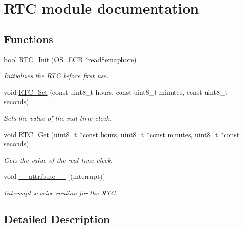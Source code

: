 \hypertarget{group___r_t_c__module}{}\section{R\+T\+C module documentation}
\label{group___r_t_c__module}
\subsection*{Functions}
\begin{DoxyCompactItemize}
\item 
bool \hyperlink{group___r_t_c__module_ga8f6fdd811ffd21bc967984a6046ec8b4}{R\+T\+C\+\_\+\+Init} (O\+S\+\_\+\+E\+C\+B $\ast$read\+Semaphore)
\begin{DoxyCompactList}\small\item\em Initializes the R\+T\+C before first use. \end{DoxyCompactList}\item 
void \hyperlink{group___r_t_c__module_gacbe916e4fad6bfc2ffcde604fa6afb52}{R\+T\+C\+\_\+\+Set} (const uint8\+\_\+t hours, const uint8\+\_\+t minutes, const uint8\+\_\+t seconds)
\begin{DoxyCompactList}\small\item\em Sets the value of the real time clock. \end{DoxyCompactList}\item 
void \hyperlink{group___r_t_c__module_ga46e1f15e3b27e2de58d7f213a3bc865d}{R\+T\+C\+\_\+\+Get} (uint8\+\_\+t $\ast$const hours, uint8\+\_\+t $\ast$const minutes, uint8\+\_\+t $\ast$const seconds)
\begin{DoxyCompactList}\small\item\em Gets the value of the real time clock. \end{DoxyCompactList}\item 
void \hyperlink{group___r_t_c__module_ga445500277ba0e363873b34cffc015745}{\+\_\+\+\_\+attribute\+\_\+\+\_\+} ((interrupt))
\begin{DoxyCompactList}\small\item\em Interrupt service routine for the R\+T\+C. \end{DoxyCompactList}\end{DoxyCompactItemize}


\subsection{Detailed Description}


